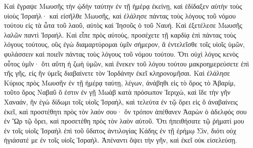{\par }{\PP {}Καὶ ἔγραψε Μωυσῆς τὴν ᾠδὴν ταύτην ἐν τῇ ἡμέρᾳ ἐκείνῃ, καὶ ἐδίδαξεν αὐτὴν τοὺς υἱοὺς Ἰσραήλ· καὶ εἰσῆλθε Μωυσῆς, καὶ ἐλάλησε πάντας τοὺς λόγους τοῦ νόμου τούτου εἰς τὰ ὦτα τοῦ λαοῦ, αὐτὸς καὶ Ἰησοῦς ὁ τοῦ Ναυή.
Καὶ ἐξετέλεσε Μωυσῆς λαλῶν παντὶ Ἰσραήλ.
Καὶ εἶπε πρὸς αὐτοὺς, προσέχετε τῇ καρδίᾳ ἐπὶ πάντας τοὺς λόγους τούτους, οὓς ἐγὼ διαμαρτύρομαι ὑμῖν σήμερον, ἃ ἐντελεῖσθε τοῖς υἱοῖς ὑμῶν, φυλάσσειν καὶ ποιεῖν πάντας τοὺς λόγους τοῦ νόμου τούτου.
Ὅτι οὐχὶ λόγος κενὸς οὗτος ὑμῖν· ὅτι αὕτη ἡ ζωὴ ὑμῶν, καὶ ἕνεκεν τοῦ λόγου τούτου μακροημερεύσετε ἐπὶ τῆς γῆς, εἰς ἣν ὑμεῖς διαβαίνετε τὸν Ἰορδάνην ἐκεῖ κληρονομῆσαι.
Καὶ ἐλάλησε Κύριος πρὸς Μωυσῆν ἐν τῇ ἡμέρᾳ ταύτῃ, λέγων,
ἀνάβηθι εἰς τὸ ὄρος τὸ Ἀβαρίμ, τοῦτο ὄρος Ναβαῦ ὅ ἐστιν ἐν γῇ Μωὰβ κατὰ πρόσωπον Ἰεριχὼ, καὶ ἴδε τὴν γῆν Χαναάν, ἣν ἐγὼ δίδωμι τοῖς υἱοῖς Ἰσραὴλ,
καὶ τελεύτα ἐν τῷ ὄρει εἰς ὃ ἀναβαίνεις ἐκεῖ, καὶ προστέθητι πρὸς τὸν λαόν σου· ὃν τρόπον ἀπέθανεν Ἀαρὼν ὁ ἀδελφός σου ἐν Ὢρ τῷ ὄρει, καὶ προσετέθη πρὸς τὸν λαὸν αὐτοῦ.
Ὅτι ἠπειθήσατε τῷ ῥήματί μου ἐν τοῖς υἱοῖς Ἰσραὴλ ἐπὶ τοῦ ὕδατος ἀντιλογίας Κάδης ἐν τῇ ἐρήμῳ Σὶν, διότι οὐχ ἡγιάσατέ με ἐν τοῖς υἱοῖς Ἰσραήλ.
Ἀπέναντι ὄψει τὴν γῆν, καὶ ἐκεῖ οὐκ εἰσελεύσῃ.

}
